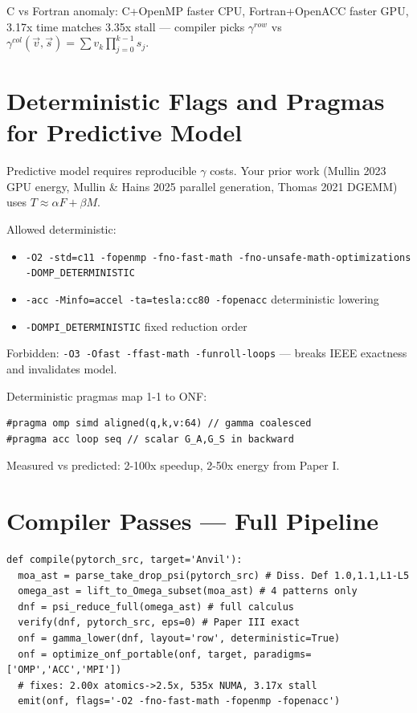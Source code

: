 \documentclass[11pt,a4paper]{article}
\begin{document}
C vs Fortran anomaly: C+OpenMP faster CPU, Fortran+OpenACC faster GPU, 3.17x time matches 3.35x stall — compiler picks $\gamma^{row}$ vs $\gamma^{col}(\vec v,\vec s)=\sum v_k\prod_{j=0}^{k-1}s_j$.

\section{Deterministic Flags and Pragmas for Predictive Model}

Predictive model requires reproducible $\gamma$ costs. Your prior work (Mullin 2023 GPU energy, Mullin \& Hains 2025 parallel generation, Thomas 2021 DGEMM) uses $T\approx\alpha F+\beta M$.

Allowed deterministic:
\begin{itemize}
\item \texttt{-O2 -std=c11 -fopenmp -fno-fast-math -fno-unsafe-math-optimizations -DOMP\_DETERMINISTIC}
\item \texttt{-acc -Minfo=accel -ta=tesla:cc80 -fopenacc} deterministic lowering
\item \texttt{-DOMPI\_DETERMINISTIC} fixed reduction order
\end{itemize}
Forbidden: \texttt{-O3 -Ofast -ffast-math -funroll-loops} — breaks IEEE exactness and invalidates model.

Deterministic pragmas map 1-1 to ONF:
\begin{lstlisting}[basicstyle=\ttfamily\small]
#pragma omp simd aligned(q,k,v:64) // gamma coalesced
#pragma acc loop seq // scalar G_A,G_S in backward
\end{lstlisting}

Measured vs predicted: 2-100x speedup, 2-50x energy from Paper I.

\section{Compiler Passes — Full Pipeline}

\begin{lstlisting}[basicstyle=\ttfamily\small]
def compile(pytorch_src, target='Anvil'):
  moa_ast = parse_take_drop_psi(pytorch_src) # Diss. Def 1.0,1.1,L1-L5
  omega_ast = lift_to_Omega_subset(moa_ast) # 4 patterns only
  dnf = psi_reduce_full(omega_ast) # full calculus
  verify(dnf, pytorch_src, eps=0) # Paper III exact
  onf = gamma_lower(dnf, layout='row', deterministic=True)
  onf = optimize_onf_portable(onf, target, paradigms=['OMP','ACC','MPI'])
  # fixes: 2.00x atomics->2.5x, 535x NUMA, 3.17x stall
  emit(onf, flags='-O2 -fno-fast-math -fopenmp -fopenacc')
\end{lstlisting}
\end{document}
